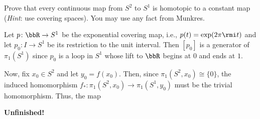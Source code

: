 \begin{problem}
  Prove that every continuous map from \(S^2\) to \(S^1\) is homotopic to a
  constant map (\emph{Hint}: use covering spaces). You may use any fact
  from Munkres.
\end{problem}
\begin{solution}
  Let \(p\colon\bbR\to S^1\) be the exponential covering map, i.e.,
  \(p(t)=\exp(2\pi\rmi t)\) and let \(p_0\colon I\to S^1\) be its
  restriction to the unit interval. Then \([p_0]\) is a generator of
  \(\pi_1(S^1)\) since \(p_0\) is a loop in \(S^1\) whose lift to \(\bbR\)
  begins at \(0\) and ends at \(1\).

  Now, fix \(x_0\in S^2\) and let \(y_0=f(x_0)\). Then, since
  \(\pi_1(S^2,x_0)\cong\{0\}\), the induced homomorphism
  \(f_*\colon\pi_1(S^2,x_0)\to\pi_1(S^1,y_0)\) must be the trivial
  homomorphism. Thus, the map

  {\color{Red!85!black}\textbf{Unfinished!}}
\end{solution}

